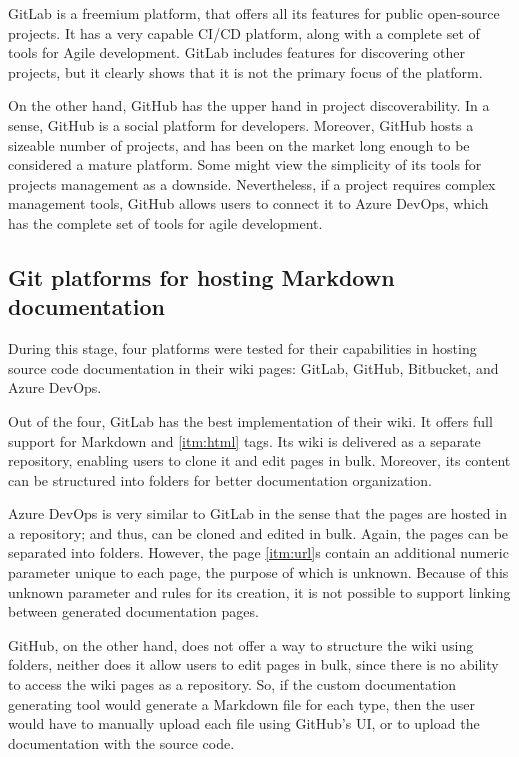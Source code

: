 GitLab is a freemium platform, that offers all its features for public open-source projects. It has a very capable CI/CD platform, along with a complete set of tools for Agile development. GitLab includes features for discovering other projects, but it clearly shows that it is not the primary focus of the platform.

On the other hand, GitHub has the upper hand in project discoverability. In a sense, GitHub is a social platform for developers. Moreover, GitHub hosts a sizeable number of projects, and has been on the market long enough to be considered a mature platform. Some might view the simplicity of its tools for projects management as a downside. Nevertheless, if a project requires complex management tools, GitHub allows users to connect it to Azure DevOps, which has the complete set of tools for agile development.

\subsection{Git platforms for hosting Markdown documentation}

During this stage, four platforms were tested for their capabilities in hosting source code documentation in their wiki pages: GitLab, GitHub, Bitbucket, and Azure DevOps.

Out of the four, GitLab has the best implementation of their wiki. It offers full support for Markdown and \ref{itm:html} tags.
Its wiki is delivered as a separate repository, enabling users to clone it and edit pages in bulk. Moreover, its content can be structured into folders for better documentation organization.

Azure DevOps is very similar to GitLab in the sense that the pages are hosted in a repository; and thus, can be cloned and edited in bulk. Again, the pages can be separated into folders. However, the page \ref{itm:url}s contain an additional numeric parameter unique to each page, the purpose of which is unknown. Because of this unknown parameter and rules for its creation, it is not possible to support linking between generated documentation pages.

GitHub, on the other hand, does not offer a way to structure the wiki using folders, neither does it allow users to edit pages in bulk, since there is no ability to access the wiki pages as a repository. So, if the custom documentation generating tool would generate a Markdown file for each type, then the user would have to manually upload each file using GitHub's UI, or to upload the documentation with the source code.

